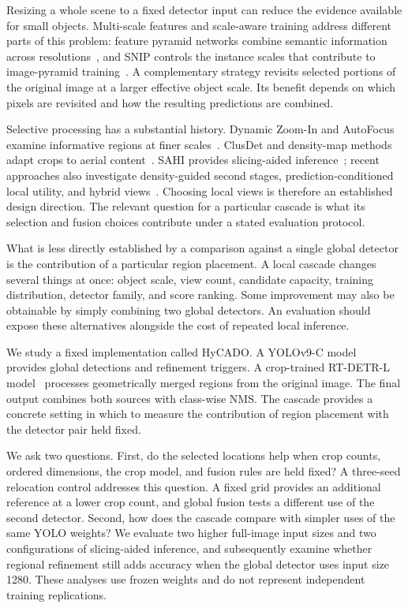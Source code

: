 \documentclass[journal]{IEEEtran}
\begin{document}
Resizing a whole scene to a fixed detector input can reduce the evidence available for small objects. Multi-scale features and scale-aware training address different parts of this problem: feature pyramid networks combine semantic information across resolutions~\cite{lin2017fpn}, and SNIP controls the instance scales that contribute to image-pyramid training~\cite{singh2018snip}. A complementary strategy revisits selected portions of the original image at a larger effective object scale. Its benefit depends on which pixels are revisited and how the resulting predictions are combined.

Selective processing has a substantial history. Dynamic Zoom-In and AutoFocus examine informative regions at finer scales~\cite{gao2018dynamic,najibi2019autofocus}. ClusDet and density-map methods adapt crops to aerial content~\cite{yang2019clusdet,li2020dmnet,duan2021cdmnet}. SAHI provides slicing-aided inference~\cite{akyon2022sahi}; recent approaches also investigate density-guided second stages, prediction-conditioned local utility, and hybrid views~\cite{xie2026dgtsod,chen2026mru,tang2026qashi}. Choosing local views is therefore an established design direction. The relevant question for a particular cascade is what its selection and fusion choices contribute under a stated evaluation protocol.

What is less directly established by a comparison against a single global detector is the contribution of a particular region placement. A local cascade changes several things at once: object scale, view count, candidate capacity, training distribution, detector family, and score ranking. Some improvement may also be obtainable by simply combining two global detectors. An evaluation should expose these alternatives alongside the cost of repeated local inference.

We study a fixed implementation called HyCADO. A YOLOv9-C model~\cite{wang2024yolov9} provides global detections and refinement triggers. A crop-trained RT-DETR-L model~\cite{zhao2024rtdetr} processes geometrically merged regions from the original image. The final output combines both sources with class-wise NMS. The cascade provides a concrete setting in which to measure the contribution of region placement with the detector pair held fixed.

We ask two questions. First, do the selected locations help when crop counts, ordered dimensions, the crop model, and fusion rules are held fixed? A three-seed relocation control addresses this question. A fixed grid provides an additional reference at a lower crop count, and global fusion tests a different use of the second detector. Second, how does the cascade compare with simpler uses of the same YOLO weights? We evaluate two higher full-image input sizes and two configurations of slicing-aided inference, and subsequently examine whether regional refinement still adds accuracy when the global detector uses input size 1280. These analyses use frozen weights and do not represent independent training replications.
\end{document}
